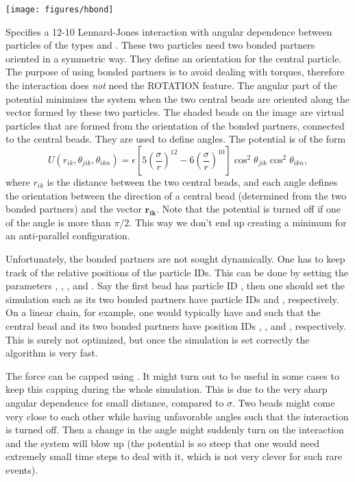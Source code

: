 \begin{center}
  \texttt{[image: figures/hbond]}
\end{center}

Specifies a 12-10 Lennard-Jones interaction with angular dependence between
particles of the types  and . These two particles need
two bonded partners oriented in a symmetric way. They define an orientation
for the central particle. The purpose of using bonded partners is to avoid
dealing with torques, therefore the interaction does \emph{not} need the
ROTATION feature. The angular part of the potential minimizes the system when
the two central beads are oriented along the vector formed by these two
particles. The shaded beads on the image are virtual particles that are formed
from the orientation of the bonded partners, connected to the central
beads. They are used to define angles. The potential is of the form
\begin{equation}
  U(r_{ik},\theta_{jik},\theta_{ikn})=
  \epsilon\left[5\left(\frac{\sigma}r\right)^{12} - 
    6\left(\frac{\sigma}{r}\right)^{10}\right]
  \cos^2\theta_{jik}\cos^2\theta_{ikn},
\end{equation}
where $r_{ik}$ is the distance between the two central beads, and each angle
defines the orientation between the direction of a central bead (determined
from the two bonded partners) and the vector $\mathbf{r_{ik}}$. Note that the
potential is turned off if one of the angle is more than $\pi/2$. This way we
don't end up creating a minimum for an anti-parallel configuration.

Unfortunately, the bonded partners are not sought dynamically. One has to keep
track of the relative positions of the particle IDs. This can be done by
setting the parameters , , , and . Say
the first bead  has particle ID , then one should set the
simulation such as its two bonded partners have particle IDs  and
, respectively. On a linear chain, for example, one would
typically have  and  such that the central bead and
its two bonded partners have position IDs , , and ,
respectively. This is surely not optimized, but once the simulation is set
correctly the algorithm is very fast.

The force can be capped using . It might turn out
to be useful in some cases to keep this capping during the whole
simulation. This is due to the very sharp angular dependence for small
distance, compared to $\sigma$. Two beads might come very close to each other
while having unfavorable angles such that the interaction is turned off. Then
a change in the angle might suddenly turn on the interaction and the system
will blow up (the potential is so steep that one would need extremely small
time steps to deal with it, which is not very clever for such rare events).

